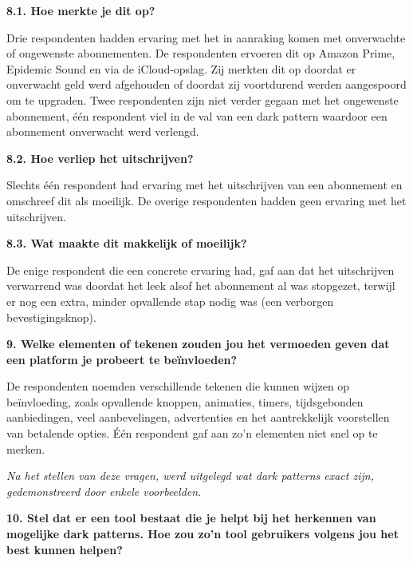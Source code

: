 \textbf{8.1. Hoe merkte je dit op?}

Drie respondenten hadden ervaring met het in aanraking komen met onverwachte of ongewenste abonnementen. De respondenten ervoeren dit op Amazon Prime, Epidemic Sound en via de iCloud-opslag. Zij merkten dit op doordat er onverwacht geld werd afgehouden of doordat zij voortdurend werden aangespoord om te upgraden. Twee respondenten zijn niet verder gegaan met het ongewenste abonnement, één respondent viel in de val van een dark pattern waardoor een abonnement onverwacht werd verlengd. 

\vspace{1em}

\textbf{8.2. Hoe verliep het uitschrijven?}

Slechts één respondent had ervaring met het uitschrijven van een abonnement en omschreef dit als moeilijk. De overige respondenten hadden geen ervaring met het uitschrijven.

\vspace{1em}

\textbf{8.3. Wat maakte dit makkelijk of moeilijk?}

De enige respondent die een concrete ervaring had, gaf aan dat het uitschrijven verwarrend was doordat het leek alsof het abonnement al was stopgezet, terwijl er nog een extra, minder opvallende stap nodig was (een verborgen bevestigingsknop).

\vspace{1em}

\textbf{9. Welke elementen of tekenen zouden jou het vermoeden geven dat een platform je probeert te beïnvloeden?}

De respondenten noemden verschillende tekenen die kunnen wijzen op beïnvloeding, zoals opvallende knoppen, animaties, timers, tijdsgebonden aanbiedingen, veel aanbevelingen, advertenties en het aantrekkelijk voorstellen van betalende opties. Één respondent gaf aan zo'n elementen niet snel op te merken.

\vspace{2em}

\textit{Na het stellen van deze vragen, werd uitgelegd wat dark patterns exact zijn, gedemonstreerd door enkele voorbeelden.}

\vspace{2em}

\textbf{10. Stel dat er een tool bestaat die je helpt bij het herkennen van mogelijke dark patterns. Hoe zou zo'n tool gebruikers volgens jou het best kunnen helpen?}

